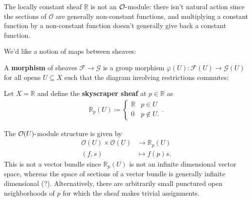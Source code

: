 \begin{example}

The locally constant sheaf \(\underline{{\mathbb{R}}}\) is not an
\({\mathcal{O}}{\hbox{-}}\)module: there isn't natural action since the
sections of \({\mathcal{O}}\) are generally non-constant functions, and
multiplying a constant function by a non-constant function doesn't
generally give back a constant function.

\end{example}

We'd like a notion of maps between sheaves:

\begin{definition}

A \textbf{morphism} of sheaves \(\mathcal{F} \to \mathcal{G}\) is a
group morphism \(\varphi(U): \mathcal{F}(U) \to \mathcal{G}(U)\) for all
opens \(U \subseteq X\) such that the diagram involving restrictions
commutes:

\begin{center}
\end{center}

\end{definition}

\begin{example}

Let \(X = {\mathbb{R}}\) and define the \textbf{skyscraper sheaf} at
\(p \in {\mathbb{R}}\) as
\begin{align*}
{\mathbb{R}}_p(U) \coloneqq
\begin{cases}
{\mathbb{R}}& p\in U 
\\
0 & p\not\in U.
\end{cases}
.\end{align*}

The \({\mathcal{O}}(U){\hbox{-}}\)module structure is given by
\begin{align*}
{\mathcal{O}}(U) \times{\mathcal{O}}(U) &\to {\mathbb{R}}_p(U) \\
(f, s) &\mapsto f(p) s
.\end{align*}
This is not a vector bundle since \({\mathbb{R}}_p(U)\) is not an
infinite dimensional vector space, whereas the space of sections of a
vector bundle is generally infinite dimensional (?). Alternatively,
there are arbitrarily small punctured open neighborhoods of \(p\) for
which the sheaf makes trivial assignments.

\end{example}

